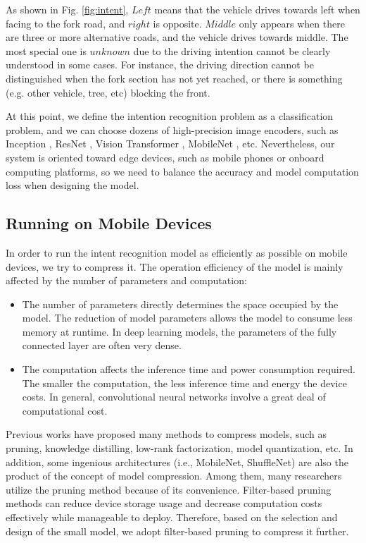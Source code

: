 \documentclass[journal]{IEEEtran}
\begin{document}
As shown in Fig. \ref{fig:intent}, $Left$ means that the vehicle drives towards left when facing to the fork road, and $right$ is opposite. $Middle$ only appears when there are three or more alternative roads, and the vehicle drives towards middle. The most special one is $unknown$ due to the driving intention cannot be clearly understood in some cases. For instance, the driving direction cannot be distinguished when the fork section has not yet reached, or there is something (e.g. other vehicle, tree, etc) blocking the front.

At this point, we define the intention recognition problem as a classification problem, and we can choose dozens of high-precision image encoders, such as Inception \cite{inceptionv3}, ResNet \cite{he2016deep}, Vision Transformer \cite{vit}, MobileNet \cite{mobilenetv3}, etc.
Nevertheless, our system is oriented toward edge devices, such as mobile phones or onboard computing platforms, so we need to balance the accuracy and model computation loss when designing the model.


\subsection{Running on Mobile Devices}

In order to run the intent recognition model as efficiently as possible on mobile devices, we try to compress it. The operation efficiency of the model is mainly affected by the number of parameters and computation:
\begin{itemize}
    \item The number of parameters directly determines the space occupied by the model. The reduction of model parameters allows the model to consume less memory at runtime. In deep learning models, the parameters of the fully connected layer are often very dense.
    \item The computation affects the inference time and power consumption required. The smaller the computation, the less inference time and energy the device costs. In general, convolutional neural networks involve a great deal of computational cost.
\end{itemize}

Previous works have proposed many methods to compress models, such as pruning, knowledge distilling, low-rank factorization, model quantization, etc. In addition, some ingenious architectures (i.e., MobileNet, ShuffleNet) are also the product of the concept of model compression. Among them, many researchers utilize the pruning method because of its convenience. Filter-based pruning methods can reduce device storage usage and decrease computation costs effectively while manageable to deploy. Therefore, based on the selection and design of the small model, we adopt filter-based pruning to compress it further.
\end{document}
